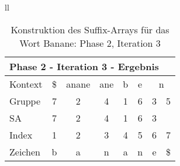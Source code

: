 \begin{table}[H]
\begin{adjustbox}{max width=\textwidth}
\begin{tabular}{ll}
\begin{tabular}{lccccccc}
\multicolumn{8}{l}{Phase 2 - Iteration 3 - Ergebnis}                                                                                                                                             \\ \hline
\multicolumn{1}{l|}{Kontext} & \multicolumn{1}{c|}{\$} & \multicolumn{1}{c|}{anane} & \multicolumn{1}{c|}{ane} & \multicolumn{1}{c|}{b} & \multicolumn{1}{c|}{e} & \multicolumn{2}{c}{n}         \\
\multicolumn{1}{l|}{Gruppe}  & \multicolumn{1}{c|}{7}  & \multicolumn{1}{c|}{2}     & \multicolumn{1}{c|}{4}   & \multicolumn{1}{c|}{1} & \multicolumn{1}{c|}{6} & 3                         & 5  \\ 
\multicolumn{1}{l|}{SA}      & \multicolumn{1}{c|}{7}  & \multicolumn{1}{c|}{2}     & \multicolumn{1}{c|}{4}   & \multicolumn{1}{c|}{1} & \multicolumn{1}{c|}{6} & \cellcolor[HTML]{\yellow}3 &    \\ \hline
\multicolumn{1}{l|}{Index}   & 1                       & 2                          & 3                        & 4                      & 5                      & 6                         & 7  \\
\multicolumn{1}{l|}{Zeichen} & b                       & a                          & n                        & a                      & n                      & e                         & \$
\end{tabular}

\end{tabular}
\end{adjustbox}

\caption[Konstruktion des Suffix-Arrays für das Wort Banane: Phase 2, Iteration 3]{Konstruktion des Suffix-Arrays für das Wort Banane: Phase 2, Iteration 3}
\label{fig_banane_2_3} 
\end{table}
